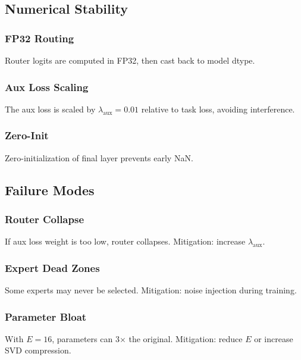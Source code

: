 \subsection{Numerical Stability}

\subsubsection{FP32 Routing}

Router logits are computed in FP32, then cast back to model dtype.

\subsubsection{Aux Loss Scaling}

The aux loss is scaled by $\lambda_\text{aux} = 0.01$ relative to task loss, 
avoiding interference.

\subsubsection{Zero-Init}

Zero-initialization of final layer prevents early NaN.

\subsection{Failure Modes}

\subsubsection{Router Collapse}

If aux loss weight is too low, router collapses. Mitigation: increase 
$\lambda_\text{aux}$.

\subsubsection{Expert Dead Zones}

Some experts may never be selected. Mitigation: noise injection during 
training.

\subsubsection{Parameter Bloat}

With $E = 16$, parameters can 3$\times$ the original. Mitigation: reduce $E$ or 
increase SVD compression.


